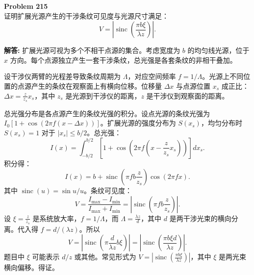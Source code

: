 \documentclass[12pt, a4paper, oneside]{ctexart}
\newenvironment{solution}{\par\noindent\textbf{解答:}\quad}{\par}
\begin{document}
\begin{mdframed}[backgroundcolor=gray!10, linewidth=0pt]
    \textbf{Problem 215} \\
    证明扩展光源产生的干涉条纹可见度与光源尺寸满足：
    \[
    V = \left| \operatorname{sinc} \left( \frac{\pi b \xi}{\lambda z} \right) \right|.
    \]
\end{mdframed}
\begin{solution}
    扩展光源可视为多个不相干点源的集合。考虑宽度为 $b$ 的均匀线光源，位于 $x$ 方向。每个点源独立产生一套干涉条纹，总光强是各套条纹的非相干叠加。

    设干涉仪两臂的光程差导致条纹周期为 $\Lambda$，对应空间频率 $f = 1/\Lambda$。光源上不同位置的点源产生的条纹在观察面上有横向位移。位移量 $\Delta x$ 与点源位置 $x_s$ 成正比：$\Delta x = \frac{z}{z_s} x_s$，其中 $z_s$ 是光源到干涉仪的距离，$z$ 是干涉仪到观察面的距离。

    总光强分布是各点源产生的条纹光强的积分。设点光源的条纹光强为 $I_0 \left[ 1 + \cos\left( 2\pi f (x - \Delta x) \right) \right]$。扩展光源的强度分布为 $S(x_s)$，均匀分布时 $S(x_s)=1$ 对于 $|x_s| \le b/2$。总光强：
    \[
    I(x) = \int_{-b/2}^{b/2} \left[ 1 + \cos\left( 2\pi f (x - \frac{z}{z_s} x_s) \right) \right] dx_s.
    \]
    积分得：
    \[
    I(x) = b + \operatorname{sinc}\left( \pi f b \frac{z}{z_s} \right) \cos(2\pi f x).
    \]
    其中 $\operatorname{sinc}(u) = \sin u / u$。条纹可见度：
    \[
    V = \frac{I_{\max} - I_{\min}}{I_{\max} + I_{\min}} = \left| \operatorname{sinc}\left( \pi f b \frac{z}{z_s} \right) \right|.
    \]
    设 $\xi = \frac{z}{z_s}$ 是系统放大率，$f = 1/\Lambda$，而 $\Lambda = \frac{\lambda z}{d}$，其中 $d$ 是两干涉光束的横向分离。代入得 $f = d/(\lambda z)$。所以
    \[
    V = \left| \operatorname{sinc} \left( \pi \frac{d}{\lambda z} b \xi \right) \right| = \left| \operatorname{sinc} \left( \frac{\pi b \xi d}{\lambda z} \right) \right|.
    \]
    题目中 $\xi$ 可能表示 $d/z$ 或其他。常见形式为 $V = \left| \operatorname{sinc} \left( \frac{\pi b \xi}{\lambda z} \right) \right|$，其中 $\xi$ 是两光束横向偏移。得证。
\end{solution}
\end{document}

